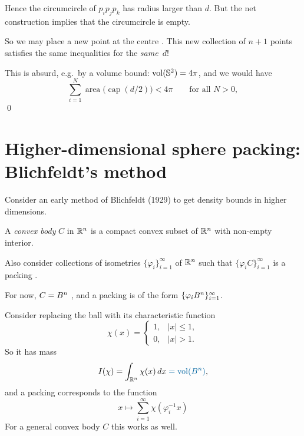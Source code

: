 Hence the circumcircle of $p_ip_jp_k$ has radius larger than $d$. But the net construction implies that
the circumcircle is empty.

So we may place a new point at the centre . This new collection of $n+1$ points satisfies the same inequalities for the \emph{same}~$d$!

This is absurd, e.g.\ by a volume bound: $\operatorname{vol}(\mathbb{S}^2)=4\pi$, and  we would have
\[
\sum_{i=1}^{N}\operatorname{area}\bigl(\operatorname{cap}(d/2)\bigr) < 4\pi \qquad\text{for all } N>0,
\]
 \qed

\section{Higher-dimensional sphere packing: Blichfeldt's method}\label{L2:sec:blichfeldt}

Consider an early method of Blichfeldt (1929) to get density bounds in higher dimensions.

\begin{definition}\label{L2:def:convexbody}
A \emph{convex body} $C$ in $\mathbb{R}^n$ is a compact convex subset of $\mathbb{R}^n$ with non-empty interior.
\end{definition}

Also consider collections of isometries $\{\varphi_i\}_{i=1}^\infty$ of $\mathbb{R}^n$ such that
$\{\varphi_iC\}_{i=1}^\infty$ is a packing .

For now, $C=B^n$ , and a packing is of the form
$\{\varphi_iB^n\}_{i=1}^\infty$.

Consider replacing the ball with its characteristic function
\[
\chi(x)=\begin{cases}1, & |x|\le1,\\ 0, & |x|>1.\end{cases}
\]
So it has mass
\[
I(\chi)=\int_{\R^n}\chi(x)\,dx \;\added{=\vol(\Ball^n)},
\]
and a packing corresponds to the function
\[
x\longmapsto\sum_{i=1}^\infty\chi(\varphi_i^{-1}x)
\]
 For a general convex body $C$ this works as well.

